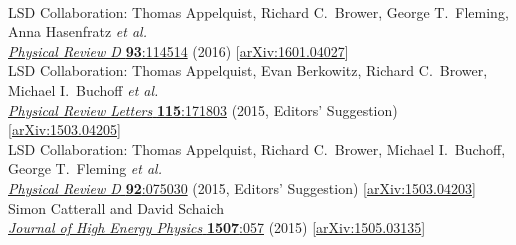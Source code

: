 \begin{spacelist}
\begin{revnumerate}
    \pagebreakitem
       \\
      LSD Collaboration: Thomas Appelquist, Richard C.~Brower, George T.~Fleming, Anna Hasenfratz \textit{et al.} \\ %
      \href{http://dx.doi.org/10.1103/PhysRevD.93.114514}{\textit{Physical Review D} \textbf{93}:114514} (2016) [\href{http://arxiv.org/abs/1601.04027}{arXiv:1601.04027}]
    \pagebreakitem
       \\
      LSD Collaboration: Thomas Appelquist, Evan Berkowitz, Richard C.~Brower, Michael I.~Buchoff \textit{et al.} \\ %
      \href{http://dx.doi.org/10.1103/PhysRevLett.115.171803}{\textit{Physical Review Letters} \textbf{115}:171803} (2015, Editors' Suggestion) [\href{http://arxiv.org/abs/1503.04205}{arXiv:1503.04205}]
    \pagebreakitem
       \\
      LSD Collaboration: Thomas Appelquist, Richard C.~Brower, Michael I.~Buchoff, George T.~Fleming \textit{et al.} \\ %
      \href{http://dx.doi.org/10.1103/PhysRevD.92.075030}{\textit{Physical Review D} \textbf{92}:075030} (2015, Editors' Suggestion) [\href{http://arxiv.org/abs/1503.04203}{arXiv:1503.04203}]
    \pagebreakitem
       \\
      Simon Catterall and David Schaich \\
      \href{http://dx.doi.org/10.1007/JHEP07(2015)057}{\textit{Journal of High Energy Physics} \textbf{1507}:057} (2015) [\href{http://arxiv.org/abs/1505.03135}{arXiv:1505.03135}]
    \pagebreakitem
       \\

\end{revnumerate}
\end{spacelist}
